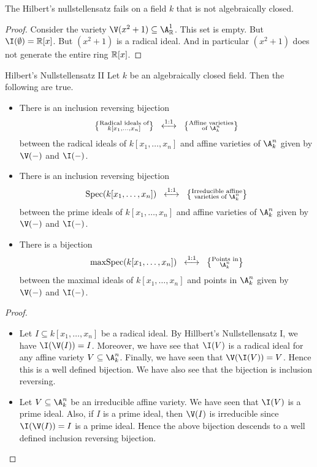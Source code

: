 \documentclass[a4paper]{article}
\begin{document}
\begin{eg}{}{} The Hilbert's nullstellensatz fails on a field $k$ that is not algebraically closed. 
\begin{proof}
Consider the variety $\V(x^2+1)\subseteq\A_\R^1$. This set is empty. But $\I(\emptyset)=\R[x]$. But $(x^2+1)$ is a radical ideal. And in particular $(x^2+1)$ does not generate the entire ring $\mathbb{R}[x]$. 
\end{proof}
\end{eg}

\begin{thm}{Hilbert's Nullstellensatz II}{} Let $k$ be an algebraically closed field. Then the following are true. 
\begin{itemize}
\item There is an inclusion reversing bijection $$\left\{\substack{\text{Radical ideals of}\\ k[x_1,\dots,x_n]}\right\}\;\;\overset{\text{1:1}}{\longleftrightarrow}\;\;\left\{\substack{\text{Affine varieties}\\\text{of }\A_k^n}\right\}$$ between the radical ideals of $k[x_1,\dots,x_n]$ and affine varieties of $\A_k^n$ given by $\V(-)$ and $\I(-)$. 
\item There is an inclusion reversing bijection $$\text{Spec}(k[x_1,\dots,x_n])\;\;\overset{\text{1:1}}{\longleftrightarrow}\;\;\left\{\substack{\text{Irreducible affine}\\\text{varieties of }\A_k^n}\right\}$$ between the prime ideals of $k[x_1,\dots,x_n]$ and affine varieties of $\A_k^n$ given by $\V(-)$ and $\I(-)$. 
\item There is a bijection $$\text{maxSpec}(k[x_1,\dots,x_n])\;\;\overset{\text{1:1}}{\longleftrightarrow}\;\;\left\{\substack{\text{Points in}\\\A_k^n}\right\}$$ between the maximal ideals of $k[x_1,\dots,x_n]$ and points in $\A_k^n$ given by $\V(-)$ and $\I(-)$. 
\end{itemize} 
\begin{proof}~\\
\begin{itemize}
\item Let $I\subseteq k[x_1,\dots,x_n]$ be a radical ideal. By Hillbert's Nullstellensatz I, we have $\I(\V(I))=I$. Moreover, we have see that $\I(V)$ is a radical ideal for any affine variety $V\subseteq\A_k^n$. Finally, we have seen that $\V(\I(V))=V$. Hence this is a well defined bijection. We have also see that the bijection is inclusion reversing. 
\item Let $V\subseteq\A_k^n$ be an irreducible affine variety. We have seen that $\I(V)$ is a prime ideal. Also, if $I$ is a prime ideal, then $\V(I)$ is irreducible since $\I(\V(I))=I$ is a prime ideal. Hence the above bijection descends to a well defined inclusion reversing bijection. 

\end{itemize}
\end{proof}
\end{thm}
\end{document}
